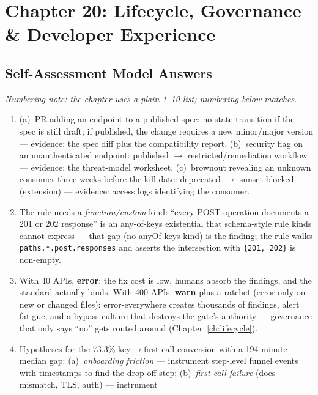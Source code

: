 \section{Chapter 20: Lifecycle, Governance \& Developer Experience}
\label{sec:sol-ch20}

\subsection{Self-Assessment Model Answers}

\emph{Numbering note: the chapter uses a plain 1--10 list; numbering below
matches.}

\begin{enumerate}[leftmargin=2.2em]
  \item (a)~PR adding an endpoint to a published spec: no state transition
    if the spec is still draft; if published, the change requires a new
    minor/major version --- evidence: the spec diff plus the compatibility
    report. (b)~security flag on an unauthenticated endpoint:
    published $\to$ restricted/remediation workflow --- evidence: the
    threat-model worksheet. (c)~brownout revealing an unknown consumer
    three weeks before the kill date: deprecated $\to$ sunset-blocked
    (extension) --- evidence: access logs identifying the consumer.
  \item The rule needs a \emph{function/custom} kind: ``every POST
    operation documents a 201 or 202 response'' is an any-of-keys
    existential that schema-style rule kinds cannot express --- that gap
    (no anyOf-keys kind) is the finding; the rule walks
    \texttt{paths.*.post.responses} and asserts the intersection with
    \texttt{\{201, 202\}} is non-empty.
  \item With 40 APIs, \textbf{error}: the fix cost is low, humans absorb
    the findings, and the standard actually binds. With 400 APIs,
    \textbf{warn} plus a ratchet (error only on new or changed files):
    error-everywhere creates thousands of findings, alert fatigue, and a
    bypass culture that destroys the gate's authority --- governance that
    only says ``no'' gets routed around (Chapter~\ref{ch:lifecycle}).
  \item Hypotheses for the 73.3\% key$\to$first-call conversion with a
    194-minute median gap: (a)~\emph{onboarding friction} --- instrument
    step-level funnel events with timestamps to find the drop-off step;
    (b)~\emph{first-call failure} (docs mismatch, TLS, auth) --- instrument

\end{enumerate}
